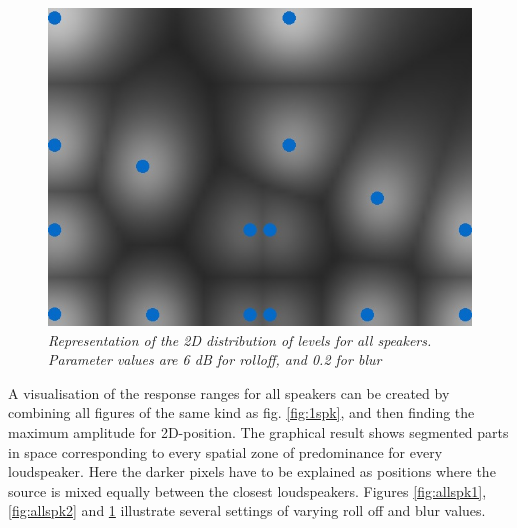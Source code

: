 \documentclass[twoside,10pt]{article}
\begin{document}
\begin{figure}[ht]
\centerline{\includegraphics[scale=0.5]{all_r_6_b_0_2}}
\caption{{\it Representation of the 2D distribution of levels for all speakers. Parameter values are 6 dB for rolloff, and 0.2 for blur}}  
\label{fig:allspk3}
\end{figure}


A visualisation of the response ranges for all speakers can be created by combining all figures of the same kind as fig. \ref{fig:1spk}, and then finding the maximum amplitude for 2D-position. The graphical result shows segmented parts in space corresponding to every spatial zone of predominance for every loudspeaker. Here the darker pixels have to be explained as positions where the source is mixed equally between the closest loudspeakers. Figures \ref{fig:allspk1}, \ref{fig:allspk2} and \ref{fig:allspk3} illustrate several settings of varying roll off and blur values. 
\end{document}
